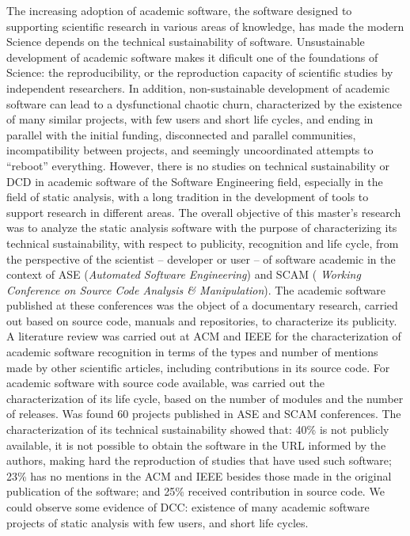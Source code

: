 The increasing adoption of academic software, the software designed to
supporting scientific research in various areas of knowledge, has made the
modern Science depends on the technical sustainability of software.
%
Unsustainable development of academic software makes it dificult one of the
foundations of Science: the reproducibility, or the reproduction capacity of
scientific studies by independent researchers.
%
In addition, non-sustainable development of academic software can lead to a
dysfunctional chaotic churn, characterized by the existence of many similar
projects, with few users and short life cycles, and ending in parallel with the
initial funding, disconnected and parallel communities, incompatibility between
projects, and seemingly uncoordinated attempts to ``reboot'' everything.
%
However, there is no studies on technical sustainability or DCD in academic
software of the Software Engineering field, especially in the field of static
analysis, with a long tradition in the development of tools to support research
in different areas.
%
The overall objective of this master's research was to analyze the static
analysis software with the purpose of characterizing its technical
sustainability, with respect to publicity, recognition and life cycle, from the
perspective of the scientist -- developer or user -- of software academic in
the context of ASE ({\it Automated Software Engineering}) and SCAM ({\it
Working Conference on Source Code Analysis \& Manipulation}).
%
The academic software published at these conferences was the object of a
documentary research, carried out based on source code, manuals and
repositories, to characterize its publicity.
%
A literature review was carried out at ACM and IEEE for the characterization of
academic software recognition in terms of the types and number of mentions made
by other scientific articles, including contributions in its source code.
%
For academic software with source code available, was carried out the
characterization of its life cycle, based on the number of modules and the
number of releases.
%
Was found 60 projects published in ASE and SCAM conferences.
%
The characterization of its technical sustainability showed that: 40\% is not
publicly available, it is not possible to obtain the software in the URL
informed by the authors, making hard the reproduction of studies that have used
such software;
%
23\% has no mentions in the ACM and IEEE besides those made in the original
publication of the software; and 25\% received contribution in source code.
%
We could observe some evidence of DCC: existence of many academic software
projects of static analysis with few users, and short life cycles.
